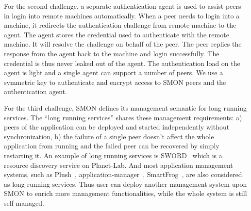 For the second challenge, a separate authentication agent is
used to assist peers in login into remote machines
automatically. When a peer needs to login into a machine, it
redirects the authentication challenge from remote machine
to the agent. The agent stores the credential used to
authenticate with the remote machine. It will resolve the
challenge on behalf of the peer. The peer replies the
response from the agent back to the machine and login
successfully. The credential is thus never leaked out of the
agent. The authentication load on the agent is light and a
single agent can support a number of peers.  We use a
symmetric key to authenticate and encrypt access to SMON
peers and the authentication agent.

For the third challenge, SMON defines its management
semantic for long running services. The ``long running
services'' shares these management requirements: a) peers of
the application can be deployed and started independently
without synchronization, b) the failure of a single peer
doesn't affect the whole application from running and the
failed peer can be recovered by simply restarting it. An
example of long running services is SWORD~\cite{sword_toit}
which is a resource discovery service on Planet-Lab.
And most application management systems, such as
Plush~\cite{Albrecht2007},
application-manager~\cite{appmanager},
SmartFrog~\cite{smartfrog}, are also considered as long
running services. Thus user can deploy another management
system upon SMON to enrich more management functionalities,
while the whole system is still self-managed.



